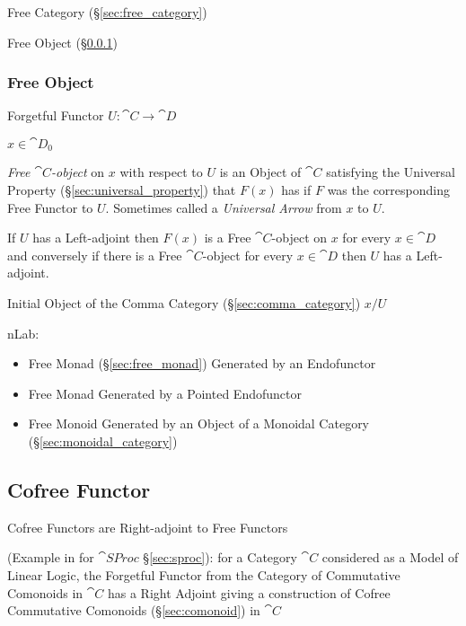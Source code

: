 Free Category (\S\ref{sec:free_category})

Free Object (\S\ref{sec:free_object})



\subsubsection{Free Object}\label{sec:free_object}

Forgetful Functor $U : \cat{C} \rightarrow \cat{D}$

$x \in \cat{D}_0$

\emph{Free $\cat{C}$-object} on $x$ with respect to $U$ is an Object
of $\cat{C}$ satisfying the Universal Property
(\S\ref{sec:universal_property}) that $F(x)$ has if $F$ was the
corresponding Free Functor to $U$. Sometimes called a \emph{Universal
  Arrow} from $x$ to $U$.

If $U$ has a Left-adjoint then $F(x)$ is a Free $\cat{C}$-object on
$x$ for every $x \in \cat{D}$ and conversely if there is a Free
$\cat{C}$-object for every $x \in \cat{D}$ then $U$ has a
Left-adjoint.

Initial Object of the Comma Category (\S\ref{sec:comma_category}) $x /
U$

nLab:

\begin{itemize}
  \item Free Monad (\S\ref{sec:free_monad}) Generated by an Endofunctor
  \item Free Monad Generated by a Pointed Endofunctor
  \item Free Monoid Generated by an Object of a Monoidal Category
    (\S\ref{sec:monoidal_category})
\end{itemize}



\subsection{Cofree Functor}\label{sec:cofree_functor}

Cofree Functors are Right-adjoint to Free Functors

(Example in \cite{abramsky-gay-nagarajan96} for $\cat{SProc}$
\S\ref{sec:sproc}): for a Category $\cat{C}$ considered as a Model of
Linear Logic, the Forgetful Functor from the Category of Commutative
Comonoids in $\cat{C}$ has a Right Adjoint giving a construction of
Cofree Commutative Comonoids (\S\ref{sec:comonoid}) in $\cat{C}$



